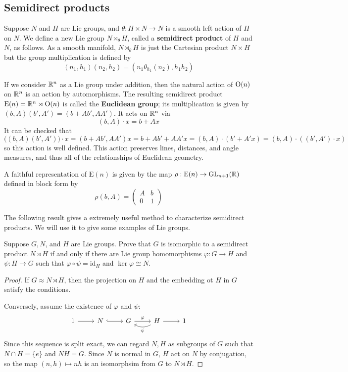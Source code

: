 \subsection{Semidirect products}
Suppose $N$ and $H$ are Lie groups, and $\theta:H\times N\to N$ is a smooth left action of $H$ on $N$. We define a new Lie group $N\rtimes_\theta H$, called a \textbf{semidirect product} of $H$ and $N$, as follows. As a smooth manifold, $N\rtimes_\theta H$ is just the Cartesian product $N\times H$ but the group multiplication is defined by
\[(n_1,h_1)(n_2,h_2)=(n_1\theta_{h_1}(n_2),h_1h_2)\]
\begin{example}\label{Euclidean group}
If we consider $\mathbb{R}^n$ as a Lie group under addition, then the natural action of $\mathrm{O}(n)$ on $\mathbb{R}^n$ is an action by automorphisms. The resulting semidirect product $\mathrm{E}(n)=\mathbb{R}^n\rtimes\mathrm{O}(n)$ is called the \textbf{Euclidean group}; its multiplication is given by $(b,A)(b',A')=(b+Ab',AA')$. It acts on $\mathbb{R}^n$ via
\[(b,A)\cdot x=b+Ax\]
It can be checked that
\[\big((b,A)(b',A')\big)\cdot x=(b+Ab',AA')x=b+Ab'+AA'x=(b,A)\cdot (b'+A'x)=(b,A)\cdot((b',A')\cdot x)\]
so this action is well defined. This action preserves lines, distances, and angle measures, and thus all of the relationships of Euclidean geometry.\par 
A faithful representation of $\mathrm{E}(n)$ is given by the map $\rho:\mathrm{E}(n)\to\mathrm{GL}_{n+1}(\mathbb{R})$ defined in block form by
\[\rho(b,A)=\begin{pmatrix}
A&b\\
0&1
\end{pmatrix}\]
\end{example}
The following result gives a extremely useful method to characterize semidirect products. We will use it to give some examples of Lie groups.
\begin{proposition}\label{semidirect product iff}
Suppose $G,N$, and $H$ are Lie groups. Prove that $G$ is isomorphic to a semidirect product $N\rtimes H$ if and only if there are Lie group homomorphisms $\varphi:G\to H$ and $\psi:H\to G$ such that $\varphi\circ\psi=\mathrm{id}_H$ and $\ker\varphi\cong N$.
\end{proposition}
\begin{proof}
If $G\approx N\rtimes H$, then the projection on $H$ and the embedding ot $H$ in $G$ satisfy the conditions.\par
Conversely, assume the existence of $\varphi$ and $\psi$:
\[\begin{tikzcd}
1\ar[r]&N\ar[r,hook]&G\ar[r,"\varphi"]&H\ar[l,bend left=30,"\psi"]\ar[r]&1
\end{tikzcd}\]
Since this sequence is split exact, we can regard $N,H$ as subgroups of $G$ such that $N\cap H=\{e\}$ and $NH=G$. Since $N$ is normal in $G$, $H$ act on $N$ by conjugation, so the map $(n,h)\mapsto nh$ is an isomorphsim from $G$ to $N\rtimes H$.
\end{proof}
